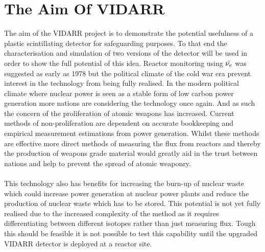 \documentclass[12pt,a4paper]{article}
\begin{document}
\section{The Aim Of VIDARR} \label{sec_theAimOfVidarr}
The aim of the VIDARR project is to demonstrate the potential usefulness of a plastic scintillating detector for safeguarding purposes. To that end the characterisation and simulation of two versions of the detector will be used in order to show the full potential of this idea. Reactor monitoring using $\Bar{\nu_e}$ was suggested as early as 1978 \cite{Borovoi_1978} but the political climate of the cold war era prevent interest in the technology from being fully realised. In the modern political climate where nuclear power is seen as a stable form of low carbon power generation more nations are considering the technology once again. And as such the concern of the proliferation of atomic weapons has increased. Current methods of non-proliferation are dependent on accurate bookkeeping and empirical measurement estimations from power generation. Whilst these methods are effective more direct methods of measuring the flux from reactors and thereby the production of weapons grade material would greatly aid in the trust between nations and help to prevent the spread of atomic weaponry. 
\\\\This technology also has benefits for increasing the burn-up of nuclear waste which could increase power generation at nuclear power plants and reduce the production of nuclear waste which has to be stored. This potential is not yet fully realised due to the increased complexity of the method as it requires differentiating between different isotopes rather than just measuring flux. Tough this should be feasible it is not possible to test this capability until the upgraded VIDARR detector is deployed at a reactor site. 
\end{document}
